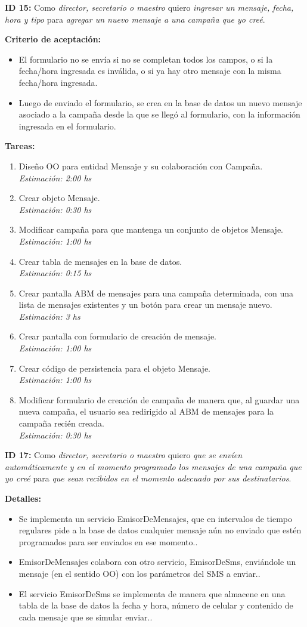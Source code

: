\documentclass[a4paper, 10pt, twoside]{article}
\newcommand{\sprintstory}[4]{
  \noindent
  \textbf{ID #1:} Como \emph{#2} quiero \emph{#3} para \emph{#4}.
}
\newenvironment{detalles}{
  \textbf{Detalles:}
  \begin{itemize}
}{
  \end{itemize}
}
\newcommand{\detalle}[1] {
  \item #1.
}
\newenvironment{criterios}{
  \textbf{Criterio de aceptación:}
  \begin{itemize}
}{
  \end{itemize}
}
\newcommand{\criterio}[1] {
  \item #1
}
\newenvironment{tasks}{
  \textbf{Tareas:}
  \begin{enumerate}
}{
  \end{enumerate}
}
\newcommand{\task}[2] {
  \item #1.\\
  \emph{Estimación: #2 hs}
}
\begin{document}
\sprintstory{15}
            {director, secretario o maestro}
            {ingresar un mensaje, fecha, hora y tipo}
            {agregar un nuevo mensaje a una campaña que yo creé}

\begin{criterios}
  \criterio{El formulario no se envía si no se completan todos los campos, o si la fecha/hora ingresada es inválida, o si ya hay otro mensaje con la misma fecha/hora ingresada.}
  \criterio{Luego de enviado el formulario, se crea en la base de datos un nuevo mensaje asociado a la campaña desde la que se llegó al formulario, con la información ingresada en el formulario.}
\end{criterios}

\begin{tasks}
  \task{Diseño OO para entidad Mensaje y su colaboración con Campaña}{2:00}
  \task{Crear objeto Mensaje}{0:30}
  \task{Modificar campaña para que mantenga un conjunto de objetos Mensaje}{1:00}
  \task{Crear tabla de mensajes en la base de datos}{0:15}
  \task{Crear pantalla ABM de mensajes para una campaña determinada, con una lista de mensajes existentes y un botón para crear un mensaje nuevo}{3}
  \task{Crear pantalla con formulario de creación de mensaje}{1:00}
  \task{Crear código de persistencia para el objeto Mensaje}{1:00}
  \task{Modificar formulario de creación de campaña de manera que, al guardar una nueva campaña, el usuario sea redirigido al ABM de mensajes para la campaña recién creada}{0:30}
\end{tasks}

\sprintstory{17}
            {director, secretario o maestro}
            {que se envíen automáticamente y en el momento programado los mensajes de una campaña que yo creé}
            {que sean recibidos en el momento adecuado por sus destinatarios}

\begin{detalles}
  \detalle{Se implementa un servicio EmisorDeMensajes, que en intervalos de tiempo regulares pide a la base de datos cualquier mensaje aún no enviado que estén programados para ser enviados en ese momento.}
  \detalle{EmisorDeMensajes colabora con otro servicio, EmisorDeSms, enviándole un mensaje (en el sentido OO) con los parámetros del SMS a enviar.}
  \detalle{El servicio EmisorDeSms se implementa de manera que almacene en una tabla de la base de datos la fecha y hora, número de celular y contenido de cada mensaje que se simular enviar.}
\end{detalles}
\end{document}
